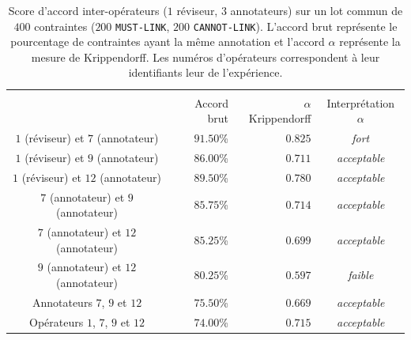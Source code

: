 			\begin{table}[!htb]
				\begin{center}
				\begin{tabular}{|c|r|r|c|}
				
					\hline
					\rowcolor{colorTableHeader!15}
						& \multicolumn{3}{c|}{
							\shortstack{Accord inter-annotateurs}
						}
						\tabularnewline
						\hhline{|~|---|}
					\rowcolor{colorTableHeader!15}
					\multirow{-2}{*}{Opérateurs} %
						& Accord brut
						& $\alpha$ Krippendorff
						& Interprétation $\alpha$
						\tabularnewline
						\hline \hline
					$1$ (réviseur) et $7$ (annotateur)
						& $91.50$\%
						& $0.825$
						& \textit{fort}
						\tabularnewline
						\hline
					$1$ (réviseur) et $9$ (annotateur)
						& $86.00$\%
						& $0.711$
						& \textit{acceptable}
						\tabularnewline
						\hline
					$1$ (réviseur) et $12$ (annotateur)
						& $89.50$\%
						& $0.780$
						& \textit{acceptable}
						\tabularnewline
						\hline
					$7$ (annotateur) et $9$ (annotateur)
						& $85.75$\%
						& $0.714$
						& \textit{acceptable}
						\tabularnewline
						\hline
					$7$ (annotateur) et $12$ (annotateur)
						& $85.25$\%
						& $0.699$
						& \textit{acceptable}
						\tabularnewline
						\hline
					$9$ (annotateur) et $12$ (annotateur)
						& $80.25$\%
						& $0.597$
						& \textit{faible}
						\tabularnewline
						\hline
					Annotateurs $7$, $9$ et $12$
						& $75.50$\%
						& $0.669$
						& \textit{acceptable}
						\tabularnewline
						\hline
					Opérateurs $1$, $7$, $9$ et $12$
						& $74.00$\%
						& $0.715$
						& \textit{acceptable}
						\tabularnewline
						\hline
				\end{tabular}
				\end{center}
				\caption{
					Score d'accord inter-opérateurs ($1$ réviseur, $3$ annotateurs) sur un lot commun de $400$ contraintes ($200$ \texttt{MUST-LINK}, $200$ \texttt{CANNOT-LINK}).
					L'accord brut représente le pourcentage de contraintes ayant la même annotation et l'accord $\alpha$ représente la mesure de Krippendorff.
					Les numéros d'opérateurs correspondent à leur identifiants leur de l'expérience.
				}
				\label{table:4.6.1-ETUDE-ROBUSTESSE-SCORE-ACCORD-INTER-ANNOTATEURS}
			\end{table}
	
